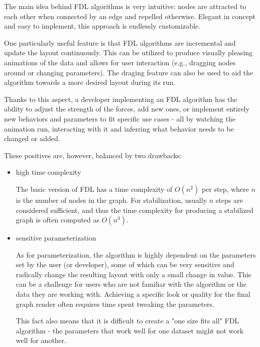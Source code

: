 The main idea behind FDL algorithms is very intuitive:
nodes are attracted to each other when connected by an edge and repelled otherwise.
Elegant in concept and easy to implement, this approach is endlessly customizable.

One particularly useful feature is that FDL algorithms are incremental and update the layout continuously.
This can be utilized to produce visually pleasing animations of the data and allows for user interaction
(e.g., dragging nodes around or changing parameters).
The draging feature can also be used to aid the algorithm towards a more desired layout during its run.

Thanks to this aspect, a developer implementing an FDL algorithm has the ability to adjust the strength of the forces, add new ones,
or implement entirely new behaviors and parameters to fit specific use cases 
- all by watching the animation run, interacting with it and inferring what behavior needs to be changed or added.

These positives are, however, balanced by two drawbacks:
\begin{itemize}
    \item high time complexity

    The basic version of FDL has a time complexity of $O(n^2)$ per step, where $n$ is the number of nodes in the graph.
    For stabilization, usually $n$ steps are considered sufficient,
    and thus the time complexity for producing a stabilized graph is often computed as $O(n^3)$.

    \item sensitive parameterization
    
    As for parameterization, the algorithm is highly dependent on the parameters set by the user (or developer),
    some of which can be very sensitive and radically change the resulting layout with only a small change in value.
    This can be a challenge for users who are not familiar with the algorithm or the data they are working with.
    Achieving a specific look or quality for the final graph render often requires time spent tweaking the parameters.

    This fact also means that it is difficult to create a "one size fits all" FDL algorithm
    - the parameters that work well for one dataset might not work well for another.
\end{itemize}